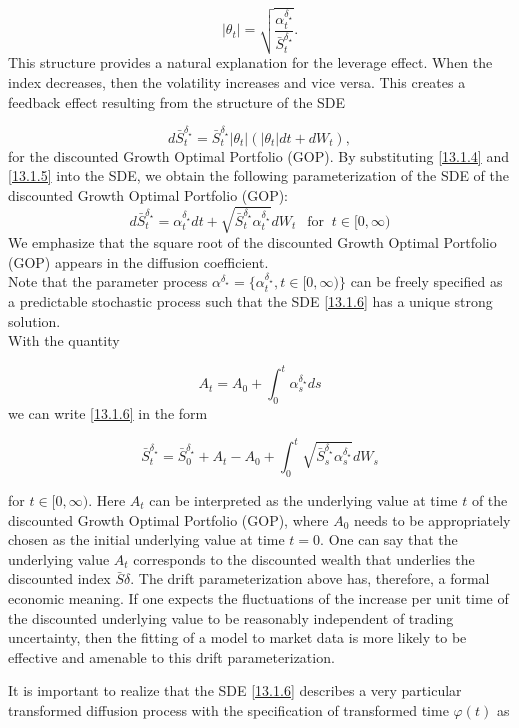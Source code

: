\documentclass[a4 paper, 12pt]{report}
\theoremstyle{plain}
\begin{document}
\begin{equation}\label{13.1.5}
|\theta_t| = \sqrt{\frac{\alpha_t^{\delta_\star}}{\bar{S}_t^{\delta_\star}}}.
\end{equation}
This structure provides a natural explanation for the leverage effect. When the index decreases, then the volatility
increases and vice versa. This creates a feedback effect resulting from the structure of the SDE

$$
d\bar{S}_t^{\delta_\star} = \bar{S}_t^{\delta_\star}|\theta_t|(|\theta_t|dt+dW_t),
$$
for the discounted Growth Optimal Portfolio (GOP). By substituting \eqref{13.1.4}  and \eqref{13.1.5} into the SDE, we obtain the following parameterization of the SDE of the discounted Growth Optimal Portfolio (GOP):
\begin{equation}\label{13.1.6}
d\bar{S}_t^{\delta_\star} = \alpha_t^{\delta_\star}dt+\sqrt{\bar{S}_t^{\delta_\star}\alpha_t^{\delta_\star}}dW_t~~\mbox{  for  }~t\in[0,\infty)
\end{equation}
We emphasize that the square root of the discounted Growth Optimal Portfolio (GOP) appears in the diffusion coefficient. \\
Note that the parameter process $\alpha^{\delta_\star} = \{\alpha_t^{\delta_\star},t\in[0,\infty)\}$ can be freely specified as a predictable stochastic process such that the SDE \eqref{13.1.6} has a unique strong solution.\\
With the quantity

\begin{equation}\label{13.1.7}
A_t = A_0+\int_0^t\alpha_s^{\delta_\star}ds
\end{equation}
we can write \eqref{13.1.6} in the form


\begin{equation}\label{13.1.8}
\bar{S}_t^{\delta_\star} = \bar{S}_0^{\delta_\star}+A_t-A_0+\int_0^t\sqrt{\bar{S}_s^{\delta_\star}\alpha_s^{\delta_\star}}dW_s
\end{equation}

for $t \in [0,\infty)$. Here $A_t$ can be interpreted as the underlying value at time $t$ of the discounted Growth Optimal Portfolio (GOP), where $A_0$ needs to
be appropriately chosen as the initial underlying value at time $t = 0$. One can say that the underlying value $A_t$ corresponds to the discounted wealth that underlies the discounted index $\bar{S}\delta$. The drift parameterization above has, therefore, a formal economic meaning. If one expects the fluctuations of the increase per unit time of the discounted underlying value to be reasonably independent of trading uncertainty, then the fitting of a model to
market data is more likely to be effective and amenable to this drift parameterization.\\
\par It is important to realize that the SDE \eqref{13.1.6} describes a very particular transformed diffusion process with the specification of  transformed time $\varphi(t)$ as 
\end{document}
